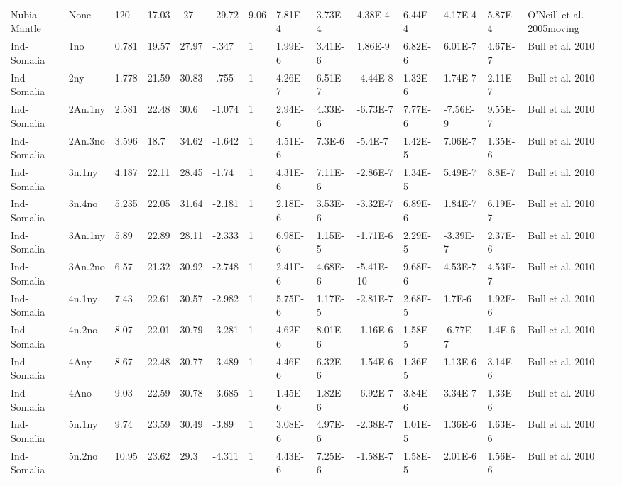 \begin{landscape}
\begin{longtable}{@{}lllllllllllllp{3.5cm}@{}}
Nubia-Mantle & None & 120 & 17.03 & -27 & -29.72 & 9.06 & 7.81E-4 & 3.73E-4 & 4.38E-4 & 6.44E-4 & 4.17E-4 & 5.87E-4 & O'Neill et al. 2005moving \\
Ind-Somalia & 1no & 0.781 & 19.57 & 27.97 & -.347 & 1 & 1.99E-6 & 3.41E-6 & 1.86E-9 & 6.82E-6 & 6.01E-7 & 4.67E-7 & Bull et al. 2010 \\
Ind-Somalia & 2ny & 1.778 & 21.59 & 30.83 & -.755 & 1 & 4.26E-7 & 6.51E-7 & -4.44E-8 & 1.32E-6 & 1.74E-7 & 2.11E-7 & Bull et al. 2010 \\
Ind-Somalia & 2An.1ny & 2.581 & 22.48 & 30.6 & -1.074 & 1 & 2.94E-6 & 4.33E-6 & -6.73E-7 & 7.77E-6 & -7.56E-9 & 9.55E-7 & Bull et al. 2010 \\
Ind-Somalia & 2An.3no & 3.596 & 18.7 & 34.62 & -1.642 & 1 & 4.51E-6 & 7.3E-6 & -5.4E-7 & 1.42E-5 & 7.06E-7 & 1.35E-6 & Bull et al. 2010 \\
Ind-Somalia & 3n.1ny & 4.187 & 22.11 & 28.45 & -1.74 & 1 & 4.31E-6 & 7.11E-6 & -2.86E-7 & 1.34E-5 & 5.49E-7 & 8.8E-7 & Bull et al. 2010 \\
Ind-Somalia & 3n.4no & 5.235 & 22.05 & 31.64 & -2.181 & 1 & 2.18E-6 & 3.53E-6 & -3.32E-7 & 6.89E-6 & 1.84E-7 & 6.19E-7 & Bull et al. 2010 \\
Ind-Somalia & 3An.1ny & 5.89 & 22.89 & 28.11 & -2.333 & 1 & 6.98E-6 & 1.15E-5 & -1.71E-6 & 2.29E-5 & -3.39E-7 & 2.37E-6 & Bull et al. 2010 \\
Ind-Somalia & 3An.2no & 6.57 & 21.32 & 30.92 & -2.748 & 1 & 2.41E-6 & 4.68E-6 & -5.41E-10 & 9.68E-6 & 4.53E-7 & 4.53E-7 & Bull et al. 2010 \\
Ind-Somalia & 4n.1ny & 7.43 & 22.61 & 30.57 & -2.982 & 1 & 5.75E-6 & 1.17E-5 & -2.81E-7 & 2.68E-5 & 1.7E-6 & 1.92E-6 & Bull et al. 2010 \\
Ind-Somalia & 4n.2no & 8.07 & 22.01 & 30.79 & -3.281 & 1 & 4.62E-6 & 8.01E-6 & -1.16E-6 & 1.58E-5 & -6.77E-7 & 1.4E-6 & Bull et al. 2010 \\
Ind-Somalia & 4Any & 8.67 & 22.48 & 30.77 & -3.489 & 1 & 4.46E-6 & 6.32E-6 & -1.54E-6 & 1.36E-5 & 1.13E-6 & 3.14E-6 & Bull et al. 2010 \\
Ind-Somalia & 4Ano & 9.03 & 22.59 & 30.78 & -3.685 & 1 & 1.45E-6 & 1.82E-6 & -6.92E-7 & 3.84E-6 & 3.34E-7 & 1.33E-6 & Bull et al. 2010 \\
Ind-Somalia & 5n.1ny & 9.74 & 23.59 & 30.49 & -3.89 & 1 & 3.08E-6 & 4.97E-6 & -2.38E-7 & 1.01E-5 & 1.36E-6 & 1.63E-6 & Bull et al. 2010 \\
Ind-Somalia & 5n.2no & 10.95 & 23.62 & 29.3 & -4.311 & 1 & 4.43E-6 & 7.25E-6 & -1.58E-7 & 1.58E-5 & 2.01E-6 & 1.56E-6 & Bull et al. 2010 \\

\end{longtable}
\end{landscape}

